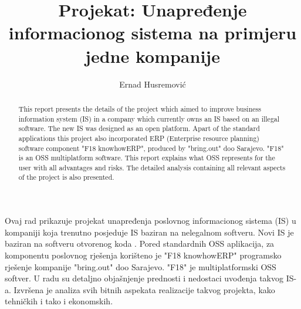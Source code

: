 \documentclass[times, utf8, seminar]{fit}
\begin{document}
\title{Projekat: Unapređenje informacionog sistema na primjeru jedne kompanije}

\author{Ernad Husremović}


\maketitle

\tableofcontents

\listoftables
\listoffigures

\begin{sazetak}

Ovaj rad prikazuje projekat unapređenja poslovnog informacionog sistema (IS) u kompaniji koja trenutno posjeduje IS baziran na nelegalnom softveru. 
Novi IS je baziran na softveru otvorenog koda .
Pored standardnih OSS aplikacija, za komponentu poslovnog rješenja korišteno je "F18 knowhowERP" programsko rješenje kompanije "bring.out" doo Sarajevo. "F18" je multiplatformski OSS softver.
U radu su detaljno objašnjenje prednosti i nedostaci uvođenja takvog IS-a.
Izvršena je analiza svih bitnih aspekata realizacije takvog projekta, kako tehničkih i tako i ekonomskih. 

\end{sazetak}

\begin{abstract}

This report presents the details of the project which aimed to improve business information system (IS) in a company which currently owns an IS based on an illegal software. The new IS was designed as an open platform. Apart of the standard applications this project also incorporated ERP (Enterprise resource planning) software component "F18 knowhowERP", produced by "bring.out" doo Sarajevo. "F18" is an OSS multiplatform software. This report explains what OSS represents for the user with all advantages and risks. The detailed analysis containing all relevant aspects of the project is also presented.

\end{abstract}
\end{document}
